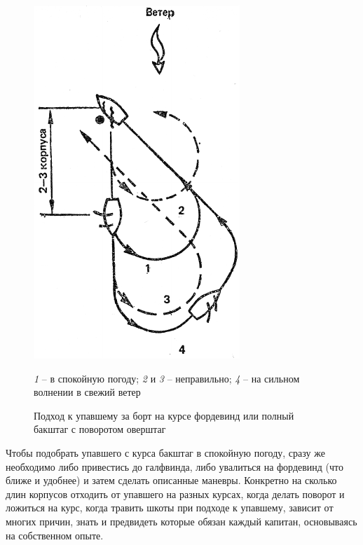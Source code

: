 \documentclass[a4paper, 12pt, twoside, final, book, russian, fittopage, cyremdash]{ncc}
\begin{document}
\begin{figure}[htb]
  \centering{}
  \includegraphics[scale=1.3]{0138P}
  \caption{Подход к упавшему за борт на курсе фордевинд или полный бакштаг с поворотом оверштаг}
  \label{fig:138}
  \small
  \centering{}
  \textit{1} \--- в спокойную погоду; \textit{2} и \textit{3} \--- неправильно; \textit{4} \--- на сильном волнении в свежий ветер
\end{figure}

Чтобы подобрать упавшего с курса бакштаг в спокойную погоду, сразу же необходимо либо привестись до галфвинда, либо увалиться на фордевинд (что ближе и удобнее) и затем сделать описанные маневры. Конкретно на сколько длин корпусов отходить от упавшего на разных курсах, когда делать поворот и ложиться на курс, когда травить шкоты при подходе к упавшему, зависит от многих причин, знать и предвидеть которые обязан каждый капитан, основываясь на собственном опыте. 
\end{document}
